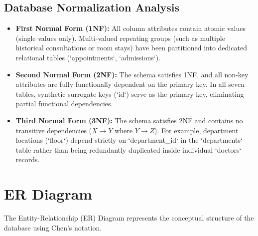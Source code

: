 \documentclass[12pt,a4paper]{article}
\begin{document}
\subsection{Database Normalization Analysis}
\begin{itemize}[noitemsep]
    \item \textbf{First Normal Form (1NF):} All column attributes contain atomic values (single values only). Multi-valued repeating groups (such as multiple historical consultations or room stays) have been partitioned into dedicated relational tables (`appointments`, `admissions`).
    \item \textbf{Second Normal Form (2NF):} The schema satisfies 1NF, and all non-key attributes are fully functionally dependent on the primary key. In all seven tables, synthetic surrogate keys (`id`) serve as the primary key, eliminating partial functional dependencies.
    \item \textbf{Third Normal Form (3NF):} The schema satisfies 2NF and contains no transitive dependencies ($X \rightarrow Y$ where $Y \rightarrow Z$). For example, department locations (`floor`) depend strictly on `department_id` in the `departments` table rather than being redundantly duplicated inside individual `doctors` records.
\end{itemize}

\section{ER Diagram}
\label{sec:erd}

The Entity-Relationship (ER) Diagram represents the conceptual structure of the database using Chen's notation. 
\end{document}
